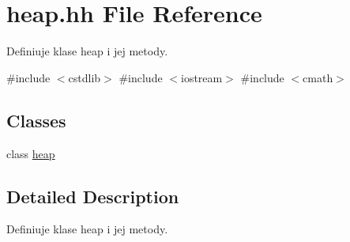 \hypertarget{heap_8hh}{\section{heap.\-hh \-File \-Reference}
\label{heap_8hh}
}


\-Definiuje klase heap i jej metody.  


{\ttfamily \#include $<$cstdlib$>$}\*
{\ttfamily \#include $<$iostream$>$}\*
{\ttfamily \#include $<$cmath$>$}\*
\subsection*{\-Classes}
\begin{DoxyCompactItemize}
\item 
class \hyperlink{classheap}{heap}
\end{DoxyCompactItemize}


\subsection{\-Detailed \-Description}
\-Definiuje klase heap i jej metody. 